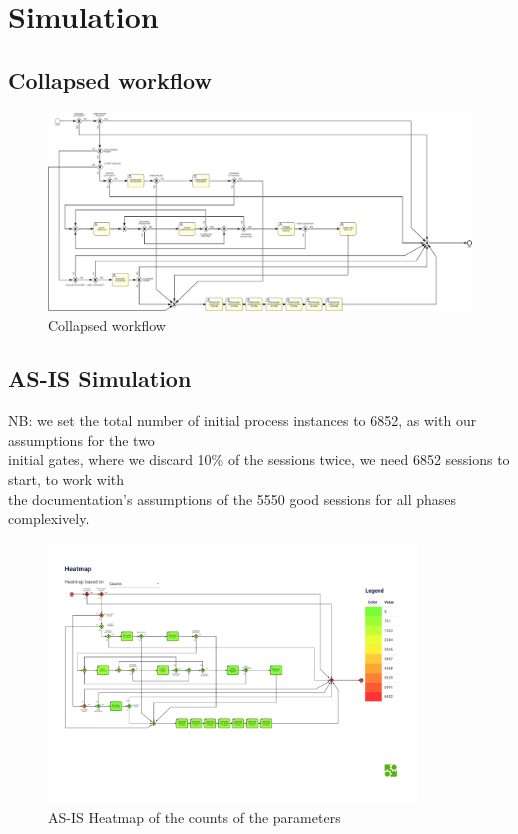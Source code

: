 \section{Simulation}
\label{sec:simulation}

\subsection{Collapsed workflow}

\begin{figure}[H]
\centering
\includegraphics[width=1\textwidth]{figures/Collapsed Workflow SIM.pdf}
\caption{Collapsed workflow}
\label{fig:collapsed_workflow}
\end{figure}

\subsection{AS-IS Simulation}
\label{sec:as_is_simulation}

NB: we set the total number of initial process instances to 6852,
as with our assumptions for the two \\ 
initial gates, where we discard 10\% of the sessions twice, we need 6852 sessions to start, to work with  \\ 
the documentation's assumptions of the 5550 good sessions for all phases complexively. \\

\begin{figure}[H]
    \centering
    \includegraphics[width=0.87\textwidth]{figures/AS-IS heatmap_counts.pdf}
    \caption{AS-IS Heatmap of the counts of the parameters}
    \label{fig:as_is_heatmap_counts}
\end{figure}

